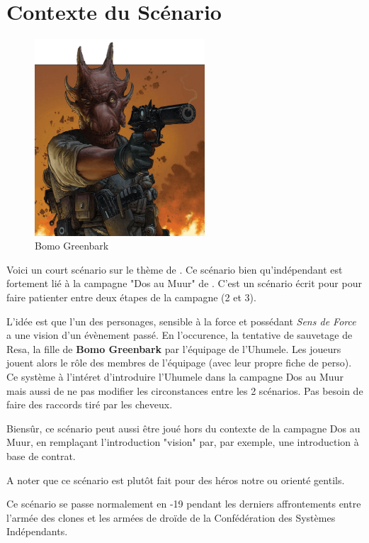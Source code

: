 \documentclass{jdrp}
\begin{document}
	\section{Contexte du Scénario}
		\begin{figure}
			\centering
			\includegraphics[width=180pt]{_img/songes-de-l-uhumele/bomo-greenbark.png}
			\caption{\label{fig:bomo-greenbark}Bomo Greenbark}
		\end{figure}

	Voici un court scénario sur le thème de . Ce scénario bien qu’indépendant est fortement lié à la campagne "Dos au Muur" de . C’est un scénario écrit pour pour faire patienter entre deux étapes de la campagne (2 et 3). 

	L’idée est que l’un des personages, sensible à la force et possédant \textit{Sens de Force} a une vision d’un évènement passé. En l’occurence, la tentative de sauvetage de Resa, la fille de \textbf{Bomo Greenbark} par l'équipage de l’Uhumele. Les joueurs jouent alors le rôle des membres de l’équipage (avec leur propre fiche de perso). Ce système à l’intéret d’introduire l’Uhumele dans la campagne Dos au Muur mais aussi de ne pas modifier les circonstances entre les 2 scénarios. Pas besoin de faire des raccords tiré par les cheveux.

	Biensûr, ce scénario peut aussi être joué hors du contexte de la campagne Dos au Muur, en remplaçant l’introduction "vision" par, par exemple, une introduction à base de contrat.

	A noter que ce scénario est plutôt fait pour des héros notre ou orienté gentils. 

	Ce scénario se passe normalement en -19 pendant les derniers affrontements entre l’armée des clones et les armées de droïde de la Confédération des Systèmes Indépendants.
\end{document}
